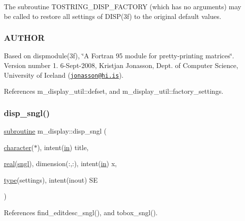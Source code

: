 The subroutine T\+O\+S\+T\+R\+I\+N\+G\+\_\+\+D\+I\+S\+P\+\_\+\+F\+A\+C\+T\+O\+RY (which has no arguments) may be called to restore all settings of D\+I\+S\+P(3f) to the original default values.

\subsubsection*{A\+U\+T\+H\+OR}

Based on dispmodule(3f), \char`\"{}\+A Fortran 95 module for pretty-\/printing matrices\char`\"{}. Version number 1. 6-\/\+Sept-\/2008, Kristjan Jonasson, Dept. of Computer Science, University of Iceland (\href{mailto:jonasson@hi.is}{\tt jonasson@hi.\+is}). 

References m\+\_\+display\+\_\+util\+::defset, and m\+\_\+display\+\_\+util\+::factory\+\_\+settings.

\mbox{\label{namespacem__display_a1e0883cef47c57b43c8de794fe7724ff}} 
\subsubsection{\texorpdfstring{disp\+\_\+sngl()}{disp\_sngl()}}
{\footnotesize\ttfamily \hyperlink{M__stopwatch_83_8txt_acfbcff50169d691ff02d4a123ed70482}{subroutine} m\+\_\+display\+::disp\+\_\+sngl (\begin{DoxyParamCaption}\item[{\hyperlink{option__stopwatch_83_8txt_abd4b21fbbd175834027b5224bfe97e66}{character}($\ast$), intent(\hyperlink{M__journal_83_8txt_afce72651d1eed785a2132bee863b2f38}{in})}]{title,  }\item[{\hyperlink{read__watch_83_8txt_abdb62bde002f38ef75f810d3a905a823}{real}(\hyperlink{namespacem__display_a2ac86bc535c3ccc5947dbb3109c666b5}{sngl}), dimension(\+:,\+:), intent(\hyperlink{M__journal_83_8txt_afce72651d1eed785a2132bee863b2f38}{in})}]{x,  }\item[{\hyperlink{stop__watch_83_8txt_a70f0ead91c32e25323c03265aa302c1c}{type}(settings), intent(inout)}]{SE }\end{DoxyParamCaption})\hspace{0.3cm}{\ttfamily [private]}}



References find\+\_\+editdesc\+\_\+sngl(), and tobox\+\_\+sngl().

